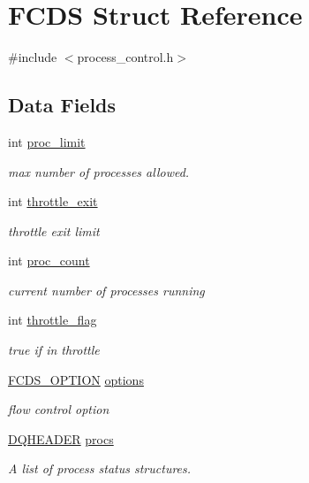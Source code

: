 \hypertarget{struct_f_c_d_s}{\section{F\-C\-D\-S Struct Reference}
\label{struct_f_c_d_s}
}


{\ttfamily \#include $<$process\-\_\-control.\-h$>$}

\subsection*{Data Fields}
\begin{DoxyCompactItemize}
\item 
int \hyperlink{struct_f_c_d_s_a70c503d9173a43accc52ad4fa5bafb5e}{proc\-\_\-limit}
\begin{DoxyCompactList}\small\item\em max number of processes allowed. \end{DoxyCompactList}\item 
int \hyperlink{struct_f_c_d_s_a785895435655db8bd37084d207ac7c81}{throttle\-\_\-exit}
\begin{DoxyCompactList}\small\item\em throttle exit limit \end{DoxyCompactList}\item 
int \hyperlink{struct_f_c_d_s_a3993a5b3c3319ca8c07b29e2bf0273ce}{proc\-\_\-count}
\begin{DoxyCompactList}\small\item\em current number of processes running \end{DoxyCompactList}\item 
int \hyperlink{struct_f_c_d_s_adbd9378cafe136fe58e589f0ea79f0ca}{throttle\-\_\-flag}
\begin{DoxyCompactList}\small\item\em true if in throttle \end{DoxyCompactList}\item 
\hyperlink{process__control_8h_a5964701ff8cca34943b355c3353b50ee}{F\-C\-D\-S\-\_\-\-O\-P\-T\-I\-O\-N} \hyperlink{struct_f_c_d_s_a5cdd77672689f5e901ee2bd260503883}{options}
\begin{DoxyCompactList}\small\item\em flow control option \end{DoxyCompactList}\item 
\hyperlink{struct_d_q_h_e_a_d_e_r}{D\-Q\-H\-E\-A\-D\-E\-R} \hyperlink{struct_f_c_d_s_a46eee4f98d3615544a47bb946496b65d}{procs}
\begin{DoxyCompactList}\small\item\em A list of process status structures. \end{DoxyCompactList}\end{DoxyCompactItemize}


